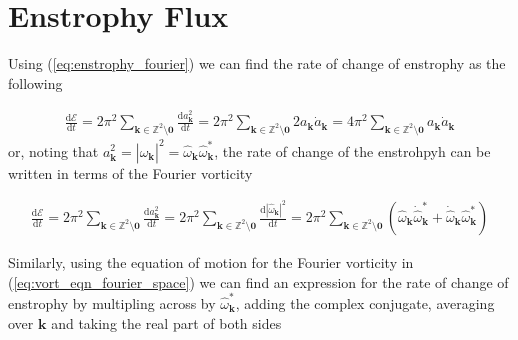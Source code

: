 \documentclass[9pt]{article}
\newcommand{\der}[2]{\frac{\mathrm{d}#1}{\mathrm{d}#2}}          	 %
\newcommand{\omegahat}[1]{\hat{\omega}_{ \mathbf{#1} } }								%
\newcommand{\bfk}{\mathbf{k}}								%
\begin{document}
\section{Enstrophy Flux}

Using (\ref{eq:enstrophy_fourier}) we can find the rate of change of enstrophy as the following

\begin{align}
\der{\mathcal{E}}{t} = 2\pi^2 \sum_{\mathbf{k}\in \mathbb{Z}^2\setminus \mathbf{0}} \der{a_{\bfk}^2}{t}  = 2\pi^2 \sum_{\mathbf{k}\in \mathbb{Z}^2\setminus \mathbf{0}} 2 a_{\bfk} \dot{a}_{\bfk} = 4\pi^2 \sum_{\mathbf{k}\in \mathbb{Z}^2\setminus \mathbf{0}} a_{\bfk} \dot{a}_{\bfk}
\end{align}
or, noting that $a_{\bfk}^2 = |\hat{\omega}_{\bfk}|^2 = \hat{\omega}_{\bfk}\hat{\omega}_{\bfk}^{*}$, the rate of change of the enstrohpyh can be written in terms of the Fourier vorticity


\begin{align}
	\der{\mathcal{E}}{t} = 2\pi^2 \sum_{\mathbf{k}\in \mathbb{Z}^2\setminus \mathbf{0}} \der{a_{\bfk}^2}{t} = 2\pi^2 \sum_{\mathbf{k}\in \mathbb{Z}^2\setminus \mathbf{0}}\der{|\hat{\omega}_{\bfk}|^2}{t} = 2\pi^2 \sum_{\mathbf{k}\in \mathbb{Z}^2\setminus \mathbf{0}} (\hat{\omega}_{\bfk} \dot{\hat{\omega}}^{*}_{\bfk} + \dot{\hat{\omega}}_{\bfk} \hat{\omega}^{*}_{\bfk})
\end{align}

Similarly, using the equation of motion for the Fourier vorticity in (\ref{eq:vort_eqn_fourier_space}) we can find an expression for the rate of change of enstrophy by multipling across by $\omegahat{k}^*$, adding the complex conjugate, averaging over $\bfk$ and taking the real part of both sides
\end{document}
